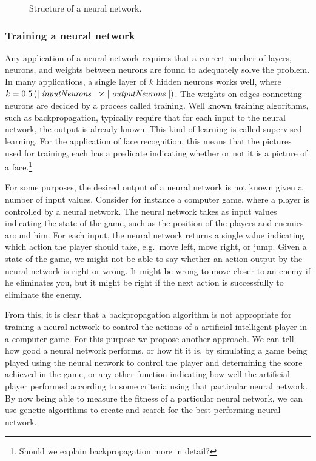 \begin{figure}[htpb]
  \centering
  
  \caption{Structure of a neural network.}
  \label{fig:ann}
\end{figure}

\subsubsection{Training a neural network}
Any application of a neural network requires that a correct number of layers, neurons, and weights between neurons are found to adequately solve the problem. In many applications, a single layer of $k$ hidden neurons works well, where $k = 0.5\left(\mid\mathit{inputNeurons}\mid \times \mid\mathit{outputNeurons}\mid\right)$\citpls. The weights on edges connecting neurons are decided by a process called training. Well known training algorithms, such as backpropagation, typically require that for each input to the neural network, the output is already known. This kind of learning is called supervised learning. For the application of face recognition, this means that the pictures used for training, each has a predicate indicating whether or not it is a picture of a face.\footnote{Should we explain backpropagation more in detail?}

For some purposes, the desired output of a neural network is not known given a number of input values. Consider for instance a computer game, where a player is controlled by a neural network. The neural network takes as input values indicating the state of the game, such as the position of the players and enemies around him. For each input, the neural network returns a single value indicating which action the player should take, e.g.\ move left, move right, or jump. Given a state of the game, we might not be able to say whether an action output by the neural network is right or wrong. It might be wrong to move closer to an enemy if he eliminates you, but it might be right if the next action is successfully to eliminate the enemy.

From this, it is clear that a backpropagation algorithm is not appropriate for training a neural network to control the actions of a artificial intelligent player in a computer game. For this purpose we propose another approach. We can tell how good a neural network performs, or how fit it is, by simulating a game being played using the neural network to control the player and determining the score achieved in the game, or any other function indicating how well the artificial player performed according to some criteria using that particular neural network. By now being able to measure the fitness of a particular neural network, we can use genetic algorithms to create and search for the best performing neural network.

